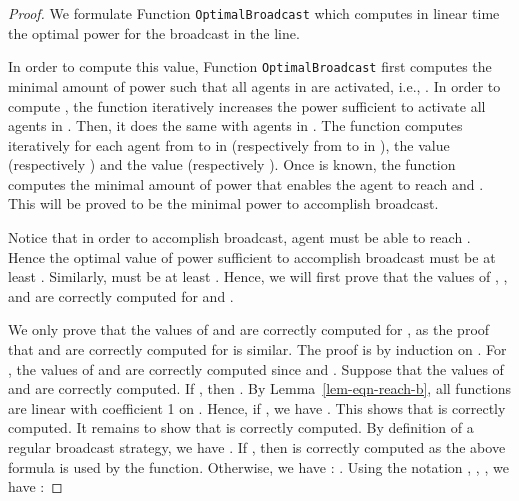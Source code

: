 \documentclass{article}
\newcommand\Optbc{\mbox{{\tt OptimalBroadcast}}\xspace}
\begin{document}
\begin{proof}
We formulate Function \Optbc which computes in linear time the optimal power for the broadcast in the line. 

\begin{function}[h!]
\caption{OptimalBroadcast (array {} of real;
  r:integer):real \label{algo:optimalBroadcast}}   
  
  


\;
\While{}  
      {
        \While{ \MyAnd }
            {
                \;
                \;
			\;
            }
        \If{}
		{
		\;
		\;
				\;
		\;
	        }
	        
	        
	        }
	        
       
\;        
       \While{}  {
                \While{ \MyAnd }
            {
                          \;
              \;
              \;
            }
        \If{ \MyAnd  \MyOr }{
               	\;
	        \;
				\;
	        		\;
	      }
        }
       
 \; 
\If{}{
 \;
  \;
 }
 \Else{
  \;
  \; 
 }
         
 \If{}
     {\;}
 \If{}
     {\;}
 \If{}
     {\;}
 \Return 
\end{function}


In order to compute this value, Function \Optbc first computes the minimal amount of power  such that all agents in  are activated, i.e., . In order to compute , the function iteratively increases the power sufficient to activate all agents in . Then, it does the same with agents in . The function computes iteratively for each agent  from  to  in  (respectively from  to  in ), the value  (respectively ) and the value  (respectively ). Once  is known, the function computes the minimal amount of power  that enables the agent  to reach  and .
This will be proved to be the minimal power to accomplish broadcast.


Notice that in order to accomplish broadcast, agent  must be able to reach . Hence the optimal value  of power sufficient to accomplish broadcast  must be at least . Similarly,  must be at least . Hence, we will first prove that the values of , ,  and  are correctly computed for  and . 

We only prove that the values of  and  
are correctly computed for , as the proof that  and  are correctly computed for  is similar. The proof is by induction on . For , the values of  and  
are correctly computed since  and . Suppose that the values of  and  are correctly computed. If , then . By Lemma~\ref{lem-eqn-reach-b}, all functions  are linear with coefficient 1 on . Hence, if , we have . This shows that  is correctly computed. It remains to show that  is correctly computed. By definition of a regular broadcast strategy, we have 
. If , then 
 is correctly computed as the above formula is used by the function. Otherwise, we have :
. Using the notation , ,
,  we have :




\end{proof}
\end{document}
